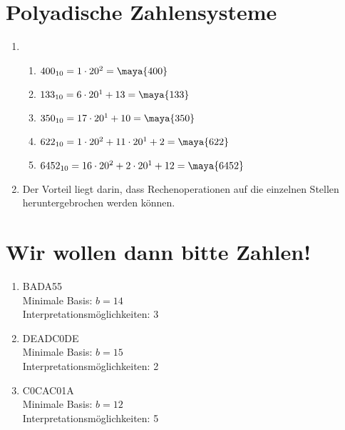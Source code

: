 \documentclass[a4paper]{article}
\begin{document}
\section{Polyadische Zahlensysteme}
\begin{enumerate}[label=\alph*)]
    \item
        \begin{enumerate}[label=\Roman*)]
            \item $ 400_{10} = 1 \cdot 20^2 = \maya{400} $ 

            \item $ 133_{10} = 6 \cdot 20^1 + 13 = \maya{133} $ 

            \item $ 350_{10} = 17 \cdot 20^1 + 10 = \maya{350} $ 

            \item $ 622_{10} = 1 \cdot 20^2 + 11 \cdot 20^1 + 2 = \maya{622} $ 

            \item $ 6452_{10} = 16 \cdot 20^2 + 2 \cdot 20^1 + 12 = \maya{6452} $ 
        \end{enumerate}
    \item Der Vorteil liegt darin, dass Rechenoperationen auf die einzelnen Stellen heruntergebrochen werden können.
\end{enumerate}

\section{Wir wollen dann bitte Zahlen!}
\begin{enumerate}[label=\alph*)]
	\item BADA55 \\
	Minimale Basis:  $b = 14$ \\
	Interpretationsmöglichkeiten: 3


	\item DEADC0DE \\
	Minimale Basis:  $b = 15$ \\
	Interpretationsmöglichkeiten: 2

	\item C0CAC01A \\
	Minimale Basis:  $b = 12$ \\
	Interpretationsmöglichkeiten: 5
\end{enumerate}
\end{document}
